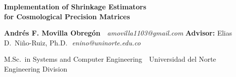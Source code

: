 \documentclass[11pt]{article}
\begin{document}
\begin{tcolorbox}[enhanced, colback=unBlue, colframe=unBlue, sharp corners,
                  left=10pt, right=10pt, top=8pt, bottom=8pt, boxrule=0pt]
  {\color{white}\bfseries\Huge Implementation of Shrinkage Estimators\\[2pt]
                              for Cosmological Precision Matrices\par}
  \vspace{6pt}
  {\color{white!90!black}\large
   \textbf{Andrés F. Movilla Obregón} \,\textperiodcentered\,
   \textit{amovilla1103@gmail.com}
   \hfill
   \textbf{Advisor:} Elias D.\ Niño-Ruiz, Ph.D.\,\textperiodcentered\,
   \textit{enino@uninorte.edu.co}\par}
  \vspace{2pt}
  {\color{unGold}\small
   M.Sc.\ in Systems and Computer Engineering \,\textperiodcentered\,
   Universidad del Norte \,\textperiodcentered\,
   Engineering Division\par}
\end{tcolorbox}

\vspace{2pt}
\end{document}
